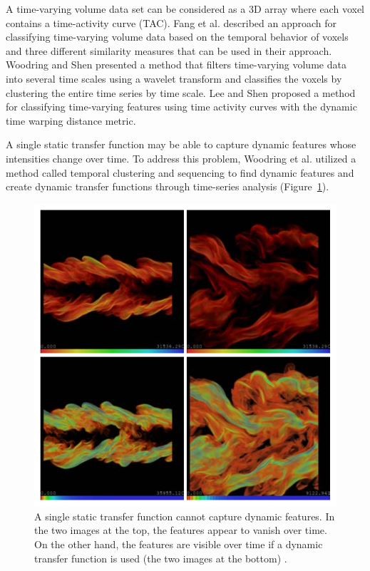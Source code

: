 \documentclass{egpubl}
\begin{document}
A time-varying volume data set can be considered as a 3D array where each voxel contains a time-activity curve (TAC). Fang et al. \cite{fang_visualization_2007} described an approach for classifying time-varying volume data based on the temporal behavior of voxels and three different similarity measures that can be used in their approach.
Woodring and Shen \cite{woodring_multiscale_2009} presented a method that filters time-varying volume data into several time scales using a wavelet transform and classifies the voxels by clustering the entire time series by time scale.
Lee and Shen \cite{lee_visualizing_2009} proposed a method for classifying time-varying features using time activity curves with the dynamic time warping distance metric.

A single static transfer function may be able to capture dynamic features whose intensities change over time.
To address this problem, Woodring et al. \cite{woodring_semi-automatic_2009} utilized a method called temporal clustering and sequencing to find dynamic features and create dynamic transfer functions through time-series analysis (Figure~\ref{fig:woodring_semi-automatic_2009}).

\begin{figure}
	\centering
	\includegraphics[width=1\linewidth]{images/woodring_semi-automatic_2009}
	\caption[A single static transfer function cannot capture dynamic features.]{A single static transfer function cannot capture dynamic features. In the two images at the top, the features appear to vanish over time. On the other hand, the features are visible over time if a dynamic transfer function is used (the two images at the bottom) \cite{woodring_semi-automatic_2009}.}
	\label{fig:woodring_semi-automatic_2009}
\end{figure}
\end{document}
